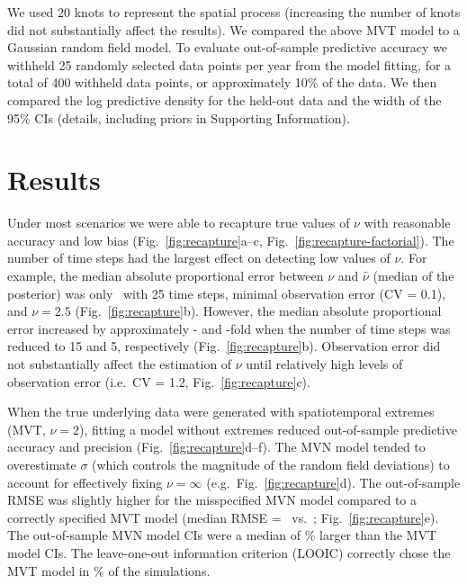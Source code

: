 \documentclass[12pt,english]{article}
\begin{document}
\begin{spacing}{1.9}
We used 20 knots to represent the spatial process
(increasing the number of knots did not substantially affect the results). We
compared the above MVT model to a Gaussian random field model. To evaluate
out-of-sample predictive accuracy we withheld 25 randomly selected data points
per year from the model fitting, for a total of 400 withheld data points, or
approximately 10\% of the data. We then compared the log predictive density for
the held-out data and the width of the 95\% CIs
(details, including priors in Supporting Information).

\section{Results}

Under most scenarios we were able to recapture true values of $\nu$ with
reasonable accuracy and low bias (Fig.~\ref{fig:recapture}a--c,
Fig.~\ref{fig:recapture-factorial}). The number of time steps had the largest
effect on detecting low values of $\nu$. For example, the median absolute
proportional error between $\nu$ and $\hat{\nu}$ (median of the posterior) was
only \mapeTwentyFive\ with 25 time steps, minimal observation error (CV = 0.1),
and $\nu = 2.5$ (Fig.~\ref{fig:recapture}b). However, the median absolute
proportional error increased by approximately \mapeFifteenIncFold - and
\mapeFiveIncFold -fold when the number of time steps was reduced to 15 and 5,
respectively (Fig.~\ref{fig:recapture}b). Observation error did not
substantially affect the estimation of $\nu$ until relatively high levels of
observation error (i.e.\ CV = 1.2, Fig.~\ref{fig:recapture}c).

When the true underlying data were generated with spatiotemporal extremes (MVT,
$\nu = 2$), fitting a model without extremes reduced out-of-sample predictive
accuracy and precision (Fig.~\ref{fig:recapture}d--f). The MVN model tended to
overestimate $\sigma$ (which controls the magnitude of the random field
deviations) to account for effectively fixing $\nu = \infty$ (e.g.\
Fig.~\ref{fig:recapture}d). The out-of-sample RMSE was slightly higher for the
misspecified MVN model compared to a correctly specified MVT model (median RMSE
= \rmseWrong\ vs.\ \rmseRight; Fig.~\ref{fig:recapture}e). The out-of-sample MVN
model CIs were a median of \medianMedianCIWiderSim \% larger than the MVT model
CIs. The leave-one-out information criterion (LOOIC) correctly chose the MVT
model in \looCorrectSim \% of the simulations.


\end{spacing}
\end{document}
